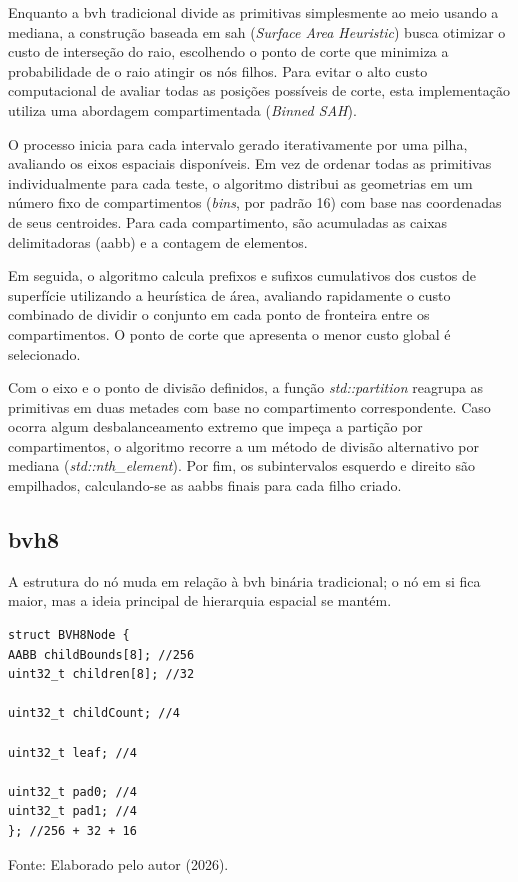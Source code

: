Enquanto a \gls{bvh} tradicional divide as primitivas simplesmente ao meio usando a mediana, a construção baseada em \gls{sah} (\textit{Surface Area Heuristic}) busca otimizar o custo de interseção do raio, escolhendo o ponto de corte que minimiza a probabilidade de o raio atingir os nós filhos. Para evitar o alto custo computacional de avaliar todas as posições possíveis de corte, esta implementação utiliza uma abordagem compartimentada (\textit{Binned SAH}).

O processo inicia para cada intervalo gerado iterativamente por uma pilha, avaliando os eixos espaciais disponíveis. Em vez de ordenar todas as primitivas individualmente para cada teste, o algoritmo distribui as geometrias em um número fixo de compartimentos (\textit{bins}, por padrão 16) com base nas coordenadas de seus centroides. Para cada compartimento, são acumuladas as caixas delimitadoras (\gls{aabb}) e a contagem de elementos.

Em seguida, o algoritmo calcula prefixos e sufixos cumulativos dos custos de superfície utilizando a heurística de área, avaliando rapidamente o custo combinado de dividir o conjunto em cada ponto de fronteira entre os compartimentos. O ponto de corte que apresenta o menor custo global é selecionado.

Com o eixo e o ponto de divisão definidos, a função \textit{std::partition} reagrupa as primitivas em duas metades com base no compartimento correspondente. Caso ocorra algum desbalanceamento extremo que impeça a partição por compartimentos, o algoritmo recorre a um método de divisão alternativo por mediana (\textit{std::nth\_element}). Por fim, os subintervalos esquerdo e direito são empilhados, calculando-se as \glspl{aabb} finais para cada filho criado.

\subsection{\gls{bvh8}}

A estrutura do nó muda em relação à \gls{bvh} binária tradicional; o nó em si fica maior, mas a ideia principal de hierarquia espacial se mantém.

\begin{lstlisting}[caption={\textit{Struct} do nó da \gls{bvh8}}, label={cod:bvh8_node}]
struct BVH8Node {
AABB childBounds[8]; //256
uint32_t children[8]; //32

uint32_t childCount; //4

uint32_t leaf; //4

uint32_t pad0; //4
uint32_t pad1; //4
}; //256 + 32 + 16
\end{lstlisting}
{\normalsize
Fonte: Elaborado pelo autor (2026).
}


